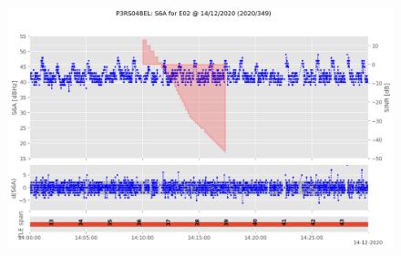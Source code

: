 \begin{enumerate}
\begin{figure}[H]%
\centering%
\includegraphics[width=0.95\linewidth]{png/P3RS04BEL_R_20203490000_01D_00U_MO_E-S6A-E02.png}%
\end{figure}


\end{enumerate}
